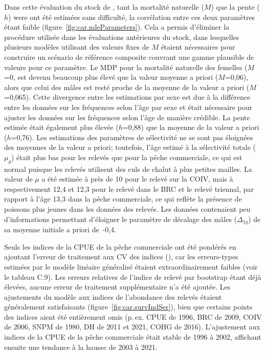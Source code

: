 \documentclass[11pt]{book}
\begin{document}
Dans cette \'{e}valuation du stock de \SPC{}, tant la mortalit\'{e} naturelle ($M$) que la pente ($h$) were ont \'{e}t\'{e} estim\'{e}es sans difficult\'{e}, la corr\'{e}lation entre ces deux param\`{e}tres \'{e}tant faible (figure~\ref{fig:car.mleParameters}).
Cela a permis d'\'{e}liminer la proc\'{e}dure utilis\'{e}e dans les \'{e}valuations ant\'{e}rieures du stock, dans lesquelles plusieurs mod\`{e}les utilisant des valeurs fixes de $M$ \'{e}taient n\'{e}cessaires pour construire un sc\'{e}nario de r\'{e}f\'{e}rence composite couvrant une gamme plausible de valeurs pour ce param\`{e}tre.
Le MDP pour la mortalit\'{e} naturelle des femelles ($M$=0, est devenu beaucoup plus \'{e}lev\'{e} que la valeur moyenne a priori ($M$=0,06), alors que celui des m\^{a}les est rest\'{e} proche de la moyenne de la valeur a priori ($M$=0,065).
Cette divergence entre les estimations par sexe est due \`{a} la diff\'{e}rence entre les donn\'{e}es sur les fr\'{e}quences selon l'\^{a}ge par sexe et \'{e}tait n\'{e}cessaire pour ajuster les donn\'{e}es sur les fr\'{e}quences selon l'\^{a}ge de mani\`{e}re cr\'{e}dible.
La pente estim\'{e}e \'{e}tait \'{e}galement plus \'{e}lev\'{e}e ($h$=0,88) que la moyenne de la valeur a priori ($h$=0,76).
Les estimations des param\`{e}tres de s\'{e}lectivit\'{e} ne se sont pas \'{e}loign\'{e}es des moyennes de la valeur a priori; toutefois, l'\^{a}ge estim\'{e} \`{a} la s\'{e}lectivit\'{e} totale ($\mu_g$) \'{e}tait plus bas pour les relev\'{e}s que pour la p\^{e}che commerciale, ce qui est normal puisque les relev\'{e}s utilisent des culs de chalut \`{a} plus petites mailles.
La valeur de $\mu$ a \'{e}t\'{e} estim\'{e}e \`{a} pr\`{e}s de 10 pour le relev\'{e} sur la COIV, mais \`{a} respectivement 12,4 et 12,3 pour le relev\'{e} dans le BRC et le relev\'{e} triennal, par rapport \`{a} l'\^{a}ge 13,3 dans la p\^{e}che commerciale, ce qui refl\`{e}te la pr\'{e}sence de poissons plus jeunes dans les donn\'{e}es des relev\'{e}s.
Les donn\'{e}es contenaient peu d'informations permettant d'\'{e}loigner le param\`{e}tre de d\'{e}calage des m\^{a}les ($\Delta_{1g}$) de sa moyenne initiale a priori de~-0,4.

Seuls les indices de la CPUE de la p\^{e}che commerciale ont \'{e}t\'{e} pond\'{e}r\'{e}s en ajoutant l'erreur de traitement aux CV des indices (\cvpro), car les erreurs-types estim\'{e}es par le mod\`{e}le lin\'{e}aire g\'{e}n\'{e}ralis\'{e} \'{e}taient extraordinairement faibles (voir le tableau C.9).
Les erreurs relatives de l'indice de relev\'{e} par bootstrap \'{e}tant d\'{e}j\`{a} \'{e}lev\'{e}es, aucune erreur de traitement suppl\'{e}mentaire n'a \'{e}t\'{e} ajout\'{e}e. Les ajustements du mod\`{e}le aux indices de l'abondance des relev\'{e}s \'{e}taient g\'{e}n\'{e}ralement satisfaisants (figure~\ref{fig:car.survIndSer}), bien que certains points des indices aient \'{e}t\'{e} enti\`{e}rement omis (p.\,ex. CPUE de 1996, BRC de 2009, COIV de 2006, SNPM de 1980, DH de 2011 et 2021, COHG de 2016). L'ajustement aux indices de la CPUE de la p\^{e}che commerciale \'{e}tait stable de 1996 \`{a} 2002, affichant ensuite une tendance \`{a} la hausse de 2003 \`{a} 2021.
\end{document}

